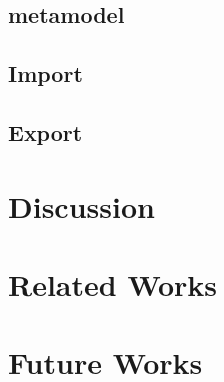 \documentclass[conference]{IEEEtran}
\begin{document}
\subsection{metamodel}

\subsection{Import}

\subsection{Export}



\section{Discussion}
\label{sec:discussion}





\section{Related Works}
\label{sec:related}



\section{Future Works}
\label{sec:future}
\end{document}
